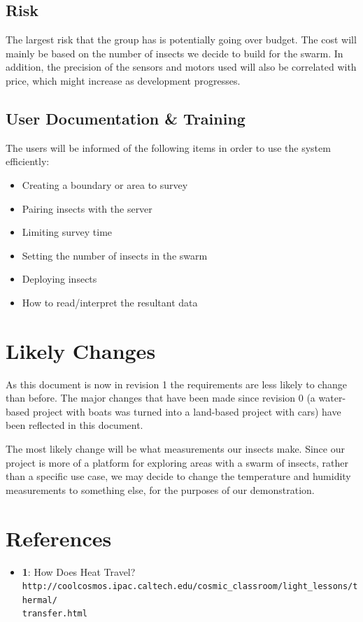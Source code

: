 \documentclass[11pt]{article}
\begin{document}
\subsection{Risk}
The largest risk that the group has is potentially going over budget. The cost will mainly be based on the number of insects we decide to build for the swarm. In addition, the precision of the sensors and motors used will also be correlated with price, which might increase as development progresses. 

\subsection{User Documentation \& Training}
The users will be informed of the following items in order to use the system efficiently:
\begin{itemize}
    \item Creating a boundary or area to survey
    \item Pairing insects with the server
    \item Limiting survey time
    \item Setting the number of insects in the swarm
    \item Deploying insects 
    \item How to read/interpret the resultant data
\end{itemize}

\section{Likely Changes}

As this document is now in revision 1 the requirements are less likely to
change than before. The major changes that have been made since revision 0
(a water-based project with boats was turned into a land-based project with
cars) have been reflected in this document.

The most likely change will be what measurements our insects make. Since
our project is more of a platform for exploring areas with a swarm of insects,
rather than a specific use case, we may decide to change the temperature and
humidity measurements to something else, for the purposes of our
demonstration.

\section{References}

\label{sec:references}
\begin{itemize}
\item \textbf{1}: How Does Heat Travel?\\
\texttt{http://coolcosmos.ipac.caltech.edu/cosmic\_classroom/light\_lessons/thermal/\\transfer.html}
\end{itemize}
\end{document}
